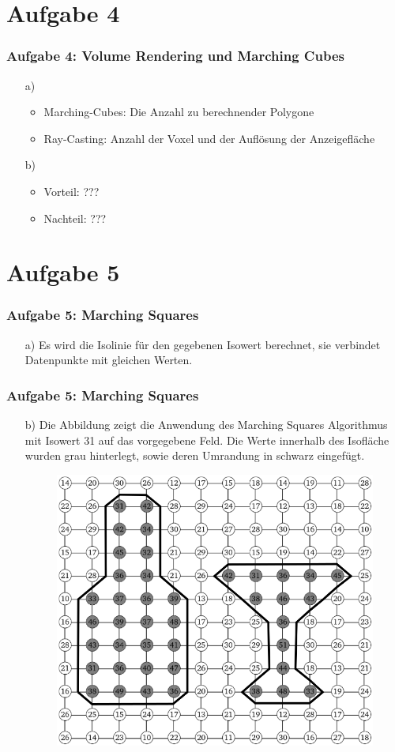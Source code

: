 \documentclass[accentcolor=tud9c,colorbacktitle,inverttitle,landscape,german,presentation,t]{tudbeamer}
\begin{document}
\section{Aufgabe 4}
\begin{frame}
	\frametitle{Aufgabe 4: Volume Rendering und Marching Cubes}
	\begin{itemize}
	\item[a)]
		\begin{itemize}
			\item Marching-Cubes: Die Anzahl zu berechnender Polygone \\
			\item Ray-Casting: Anzahl der Voxel und der Auflösung der Anzeigefläche
		\end{itemize}
	\item[b)] %
	\begin{itemize}
		\item Vorteil: ??? \\
		\item Nachteil: ???
	\end{itemize}
	\end{itemize}
\end{frame}

\section{Aufgabe 5}
\begin{frame}
	\frametitle{Aufgabe 5: Marching Squares}
	\begin{itemize}
		\item[a)] Es wird die Isolinie für den gegebenen Isowert berechnet, sie verbindet Datenpunkte mit gleichen Werten.
		
	\end{itemize}
\end{frame}
\begin{frame}
	\frametitle{Aufgabe 5: Marching Squares}
	\begin{itemize}
		\item[b)]
		Die Abbildung zeigt die Anwendung des Marching Squares Algorithmus mit Isowert 31 auf das vorgegebene Feld. Die Werte innerhalb des Isofläche wurden grau hinterlegt, sowie deren Umrandung in schwarz eingefügt.
		\begin{figure}
			\includegraphics[width = .4\linewidth]{task_5b.png}
			\label{MaSq}
		\end{figure}
	\end{itemize}
\end{frame}
\end{document}
